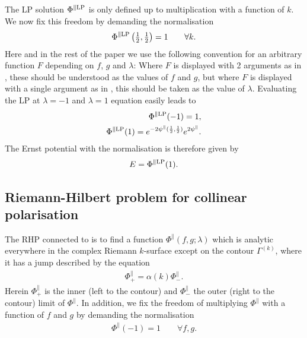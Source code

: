 \documentclass[12pt]{iopart}
\begin{document}
The LP solution $\Phi^{\|\rm LP}$ is only defined up to multiplication with a function of $k$. We now fix this freedom by demanding the normalisation
\begin{equation}
\Phi^{\|\rm LP}\left(\mbox{$\frac12$},\mbox{$\frac12$}\right)=1 \quad\quad \forall k. \label{NormPhiLP}
\end{equation}
Here and in the rest of the paper we use the following convention for an arbitrary function $F$ depending on $f$, $g$ and $\lambda$: Where $F$ is displayed with 2 arguments as in , these should be understood as the values of $f$ and $g$, but where $F$ is displayed with a single argument as in , this should be taken as the value of $\lambda$. Evaluating the LP  at $\lambda=-1$ and $\lambda=1$ equation  easily leads to 
\begin{eqnarray} 
  \Phi^{\|\rm LP}(-1)=1,     \label{PhipLPminEins}\\ 
  \Phi^{\|\rm LP}(1)=e^{-2\psi^\|(\frac12,\frac12)}e^{2\psi^\|}.
\end{eqnarray}
The Ernst potential with the normalisation  is therefore given by
\begin{eqnarray} 
  E=\Phi^{\|\rm LP}(1). \label{DefPsippPhi}
\end{eqnarray}



\subsection{Riemann-Hilbert problem for collinear polarisation}

The RHP connected to  is to find a function ${\Phi}^\|(f,g;\lambda)$ which is analytic everywhere in the complex Riemann $k$-surface except on the contour $\Gamma^{(k)}$, where it has a jump described by the equation
\begin{eqnarray} \label{Sprung}
{\Phi}_+^\|=\alpha(k){\Phi}_-^\|.
\end{eqnarray}
Herein ${\Phi}_+^\|$ is the inner (left to the contour) and ${\Phi}_-^\|$ the outer (right to the contour) limit of ${\Phi}^\|$. In addition, we fix the freedom of multiplying ${\Phi}^\|$ with a function of $f$ and $g$ by demanding the normalisation
\begin{eqnarray} \label{NormPhiRHP}
  {\Phi}^\|(-1)=1 \quad\quad \forall f,g.    
\end{eqnarray}
\end{document}
